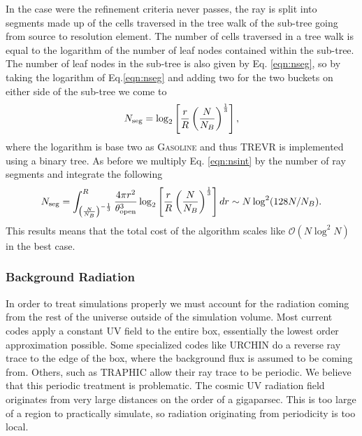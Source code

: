 \documentclass[fleq,usenatbib]{mnras}
\newcommand{\acro}{TREVR}
\newcommand{\bigO}[1]{\mathcal{O}\left(#1\right)}
\newcommand{\tO}{\theta_{\rm open}}
\begin{document}
In the case were the refinement criteria never passes, the ray is split into 
segments made up of the cells traversed in the tree walk of the sub-tree going 
from source to resolution element. The number of cells traversed in a tree walk
is equal to the logarithm of the number of leaf nodes contained within the 
sub-tree. The number of leaf nodes in the sub-tree is also given by Eq. 
\ref{eqn:nseg}, so by taking the logarithm of Eq.\ref{eqn:nseg} and adding two 
for the two buckets on either side of the sub-tree we come to
\begin{equation}
\label{eqn:nseg2}
N_{\rm seg} = \log_2\left[\frac{r}{R}\left(
\frac{N}{N_B}\right)^\frac{1}{3}\right],
\end{equation}
where the logarithm is base two as \textsc{Gasoline} and thus \acro{} is 
implemented using a binary tree. As before we multiply Eq. \ref{eqn:nsint} 
by the number of ray segments and integrate the following
\begin{equation}
\label{eqn:nsegint2}
N_{\rm seg} = \int_{\left(\frac{N}{N_B}\right)^{-\frac{1}{3}}}^R 
\frac{4\pi r^2}{\tO^3}
\log_2\left[\frac{r}{R}\left(
\frac{N}{N_B}\right)^\frac{1}{3}\right] dr
\sim N\log^2(128 N/N_B).
\end{equation}
This results means that the total cost of the algorithm scales like 
$\bigO{N\log^2N}$ in the best case.

\subsubsection{Background Radiation}
In order to treat simulations properly we must account for the radiation 
coming from the rest of the universe outside of the simulation volume. Most 
current codes apply a constant UV field to the entire box, essentially the 
lowest order approximation possible. Some specialized codes like URCHIN 
\citep{altayTheuns13} do a reverse ray trace to the edge of the box, where the 
background flux is assumed to be coming from. Others, such as TRAPHIC 
\citep{pawlikSchaye08} allow their ray trace to be periodic. We believe
that this periodic treatment is problematic. The cosmic UV radiation field 
originates from very large distances on the order of a gigaparsec. This is too 
large of a region to practically simulate, so radiation originating from 
periodicity is too local.
\end{document}
